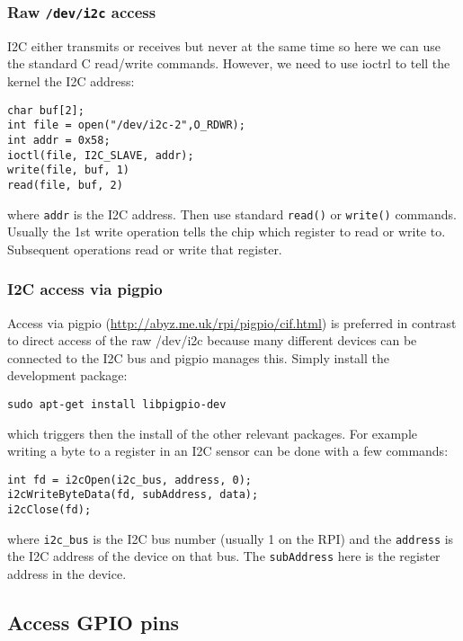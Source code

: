 \documentclass[12pt]{report}
\begin{document}
\subsubsection{Raw \texttt{/dev/i2c} access}
I2C either transmits or receives but never at the same time so here we
can use the standard C read/write commands. However, we need to use ioctrl to tell
the kernel the I2C address:
\begin{verbatim}
char buf[2];
int file = open("/dev/i2c-2",O_RDWR);
int addr = 0x58;
ioctl(file, I2C_SLAVE, addr);
write(file, buf, 1)
read(file, buf, 2)
\end{verbatim}
where \texttt{addr} is the I2C address. Then use standard \texttt{read()}
or \texttt{write()} commands. Usually the 1st write operation tells the chip
which register to read or write to. Subsequent operations read
or write that register.

\subsubsection{I2C access via pigpio}
Access via pigpio (\url{http://abyz.me.uk/rpi/pigpio/cif.html})
is preferred in contrast to direct
access of the raw /dev/i2c because many different devices
can be connected to the I2C bus and pigpio manages this.
Simply install the development package:
\begin{verbatim}
sudo apt-get install libpigpio-dev
\end{verbatim}
which triggers then the install of the other relevant packages.
For example writing a byte to a register in an I2C sensor can be done with a
few commands:
\begin{verbatim}
int fd = i2cOpen(i2c_bus, address, 0);
i2cWriteByteData(fd, subAddress, data);
i2cClose(fd);
\end{verbatim}
where \texttt{i2c\_bus} is the I2C bus number (usually 1 on the RPI)
and the \texttt{address} is the I2C address of the device on that bus.
The \texttt{subAddress} here is the register address in the device.

\subsection{Access GPIO pins}
\end{document}
